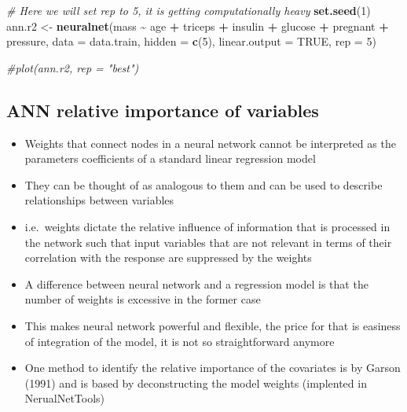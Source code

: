 \documentclass[
]{book}
\newenvironment{Shaded}{\begin{snugshade}}{\end{snugshade}}
\newcommand{\CommentTok}[1]{\textcolor[rgb]{0.56,0.35,0.01}{\textit{#1}}}
\newcommand{\DataTypeTok}[1]{\textcolor[rgb]{0.13,0.29,0.53}{#1}}
\newcommand{\DecValTok}[1]{\textcolor[rgb]{0.00,0.00,0.81}{#1}}
\newcommand{\KeywordTok}[1]{\textcolor[rgb]{0.13,0.29,0.53}{\textbf{#1}}}
\newcommand{\NormalTok}[1]{#1}
\newcommand{\OperatorTok}[1]{\textcolor[rgb]{0.81,0.36,0.00}{\textbf{#1}}}
\newcommand{\OtherTok}[1]{\textcolor[rgb]{0.56,0.35,0.01}{#1}}
\newcommand{\StringTok}[1]{\textcolor[rgb]{0.31,0.60,0.02}{#1}}
\providecommand{\tightlist}{%
  \setlength{\itemsep}{0pt}\setlength{\parskip}{0pt}}
\theoremstyle{definition}
\theoremstyle{definition}
\theoremstyle{definition}
\theoremstyle{remark}
\begin{document}
\begin{Shaded}
\begin{Highlighting}[]
\CommentTok{\# Here we will set rep to 5, it is getting computationally heavy}
\KeywordTok{set.seed}\NormalTok{(}\DecValTok{1}\NormalTok{)}
\NormalTok{ann.r2 \textless{}{-}}\StringTok{ }\KeywordTok{neuralnet}\NormalTok{(mass }\OperatorTok{\textasciitilde{}}\StringTok{  }\NormalTok{age }\OperatorTok{+}\StringTok{ }\NormalTok{triceps  }\OperatorTok{+}\StringTok{ }\NormalTok{insulin }\OperatorTok{+}\StringTok{ }\NormalTok{glucose }\OperatorTok{+}\StringTok{ }\NormalTok{pregnant }\OperatorTok{+}\StringTok{ }\NormalTok{pressure, }
                        \DataTypeTok{data =}\NormalTok{ data.train,}
                        \DataTypeTok{hidden =} \KeywordTok{c}\NormalTok{(}\DecValTok{5}\NormalTok{),}
                        \DataTypeTok{linear.output =} \OtherTok{TRUE}\NormalTok{, }
                        \DataTypeTok{rep =} \DecValTok{5}\NormalTok{)}

\CommentTok{\#plot(ann.r2, rep = "best")}
\end{Highlighting}
\end{Shaded}

\hypertarget{ann-relative-importance-of-variables}{%
\subsection{ANN relative importance of variables}\label{ann-relative-importance-of-variables}}

\begin{itemize}
\tightlist
\item
  Weights that connect nodes in a neural network cannot be interpreted as the parameters coefficients of a standard linear regression model
\item
  They can be thought of as analogous to them and can be used to describe relationships between variables
\item
  i.e.~weights dictate the relative influence of information that is processed in the network such that input variables that are not relevant in terms of their correlation with the response are suppressed by the weights
\item
  A difference between neural network and a regression model is that the number of weights is excessive in the former case
\item
  This makes neural network powerful and flexible, the price for that is easiness of integration of the model, it is not so straightforward anymore
\item
  One method to identify the relative importance of the covariates is by Garson (1991) and is based by deconstructing the model weights (implented in NerualNetTools)
\end{itemize}
\end{document}
